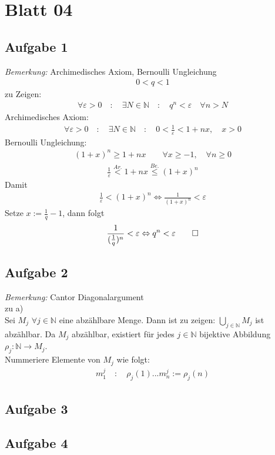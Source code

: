 \chapter{Blatt 04}
\section{Aufgabe 1}
\textit{Bemerkung:} Archimedisches Axiom, Bernoulli Ungleichung\\
\begin{align}
  0<q<1
\end{align}
zu Zeigen:
\begin{align}
  \forall \varepsilon >0\quad :\quad\exists N\in\mathbb{N}\quad :\quad q^n<\varepsilon \quad\forall n>N
\end{align}
Archimedisches Axiom:
\begin{align}
  \forall \varepsilon >0\quad :\quad\exists N\in\mathbb{N}\quad :\quad0<\frac{1}{\varepsilon}<1+nx,\quad x > 0
\end{align}
Bernoulli Ungleichung:
\begin{align}
  (1+x)^n\geq 1+nx \qquad\forall x\geq-1,\quad\forall n\geq0
\end{align}
\begin{align}
  \frac{1}{\varepsilon}\overset{Ar.}{<}1+nx\overset{Be.}{\leq}(1+x)^n
\end{align}
Damit
\begin{align}
  \frac{1}{\varepsilon}<(1+x)^n \Leftrightarrow \frac{1}{(1+x)^n}<\varepsilon
\end{align}
Setze $x:= \frac{1}{q}-1$, dann folgt
\begin{align}
  \frac{1}{(\frac{1}{q})^n}<\varepsilon \Leftrightarrow q^n<\varepsilon\qed
\end{align}
\section{Aufgabe 2}
\textit{Bemerkung:} Cantor Diagonalargument\\
zu a)\\
Sei $M_j$ $\forall j \in \mathbb{N}$ eine abzählbare Menge. Dann ist zu zeigen: $\bigcup\limits_{j \in \mathbb{N}}M_j$ ist abzählbar. Da $M_j$ abzählbar, existiert für jedes $j\in\mathbb{N}$ bijektive Abbildung $\rho_j:\mathbb{N}\rightarrow M_j$.\\
Nummeriere Elemente von $M_j$ wie folgt:
\begin{align}
  m_{1}^{j}\quad : \quad \rho_{j}(1) ... m_{n}^{j}:= \rho_{j}(n)
\end{align}
\section{Aufgabe 3}
\section{Aufgabe 4}
